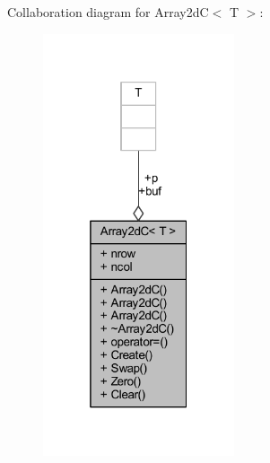 Collaboration diagram for Array2dC$<$ T $>$\+:\nopagebreak
\begin{figure}[H]
\begin{center}
\leavevmode
\includegraphics[width=160pt]{class_array2d_c__coll__graph}
\end{center}
\end{figure}
